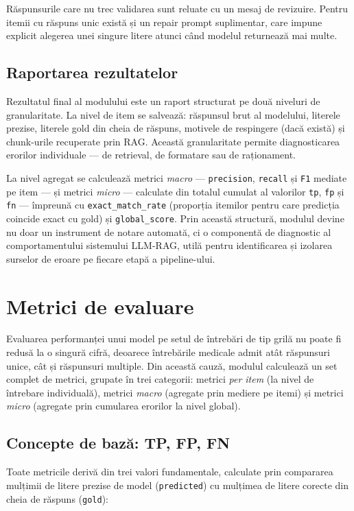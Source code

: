 \documentclass[12pt, a4paper, oneside, romanian]{teza-upb}
\begin{document}
Răspunsurile care nu trec validarea sunt reluate cu un mesaj de revizuire. Pentru itemii cu răspuns unic există și un repair prompt suplimentar, care impune explicit alegerea unei singure litere atunci când modelul returnează mai multe.
\subsection{Raportarea rezultatelor}

Rezultatul final al modulului este un raport structurat pe două niveluri de granularitate. La nivel de item se salvează: răspunsul brut al modelului, literele prezise, literele gold din cheia de răspuns, motivele de respingere (dacă există) și chunk-urile recuperate prin RAG. Această granularitate permite diagnosticarea erorilor individuale --- de retrieval, de formatare sau de raționament.

La nivel agregat se calculează metrici \textit{macro} --- \texttt{precision}, \texttt{recall} și \texttt{F1} mediate pe item --- și metrici \textit{micro} --- calculate din totalul cumulat al valorilor \texttt{tp}, \texttt{fp} și \texttt{fn} --- împreună cu \texttt{exact\_match\_rate} (proporția itemilor pentru care predicția coincide exact cu gold) și \texttt{global\_score}. Prin această structură, modulul devine nu doar un instrument de notare automată, ci o componentă de diagnostic al comportamentului sistemului LLM-RAG, utilă pentru identificarea și izolarea surselor de eroare pe fiecare etapă a pipeline-ului.

\section{Metrici de evaluare}

Evaluarea performanței unui model pe setul de întrebări de tip grilă nu poate fi redusă la o singură cifră, deoarece întrebările medicale admit atât răspunsuri unice, cât și răspunsuri multiple. Din această cauză, modulul calculează un set complet de metrici, grupate în trei categorii: metrici \textit{per item} (la nivel de întrebare individuală), metrici \textit{macro} (agregate prin mediere pe itemi) și metrici \textit{micro} (agregate prin cumularea erorilor la nivel global).

\subsection{Concepte de bază: TP, FP, FN}

Toate metricile derivă din trei valori fundamentale, calculate prin compararea mulțimii de litere prezise de model (\texttt{predicted}) cu mulțimea de litere corecte din cheia de răspuns (\texttt{gold}):
\end{document}
